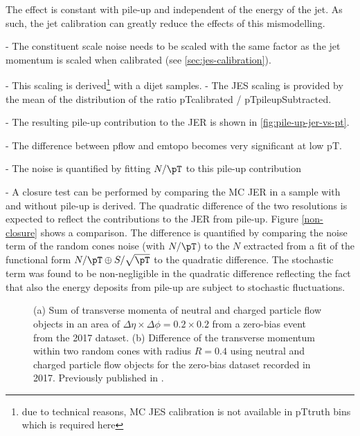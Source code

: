 The effect is constant with pile-up and independent of the energy of the jet. As such, the jet calibration can greatly reduce the effects of this mismodelling.

- The constituent scale noise needs to be scaled with the same factor as the jet momentum is scaled when calibrated (see \cref{sec:jes-calibration}).

- This scaling is derived\footnote{due to technical reasons, MC JES calibration is not available in pTtruth bins which is required here} with a dijet samples.
- The JES scaling is provided by the mean of the distribution of the ratio pTcalibrated / pTpileupSubtracted.

- The resulting pile-up contribution to the JER is shown in \cref{fig:pile-up-jer-vs-pt}.

- The difference between pflow and emtopo becomes very significant at low pT.

- The noise is quantified by fitting $N/\pT$ to this pile-up contribution

- A closure test can be performed by comparing the MC JER in a sample with and without pile-up is derived. The quadratic difference of the two resolutions is expected to reflect the contributions to the JER from pile-up. Figure \cref{non-closure} shows a comparison. The difference is quantified by comparing the noise term of the random cones noise (with $N/\pT$) to the $N$ extracted from a fit of the functional form $N/\pT \oplus S/\sqrt{\pT}$ to the quadratic difference. The stochastic term was found to be non-negligible in the quadratic difference reflecting the fact that also the energy deposits from pile-up are subject to stochastic fluctuations.

\FloatBarrier
\begin{figure}
    \caption{(a) Sum of transverse momenta of neutral and charged particle flow objects in an area of $\Delta \eta \times \Delta \phi = 0.2 \times 0.2$ from a zero-bias event from the 2017 dataset. (b) Difference of the transverse momentum within two random cones with radius $R = 0.4$ using neutral and charged particle flow objects for the zero-bias dataset recorded in 2017.
        Previously published in .}
    \label{fig:random-cones-balance}
\end{figure}

